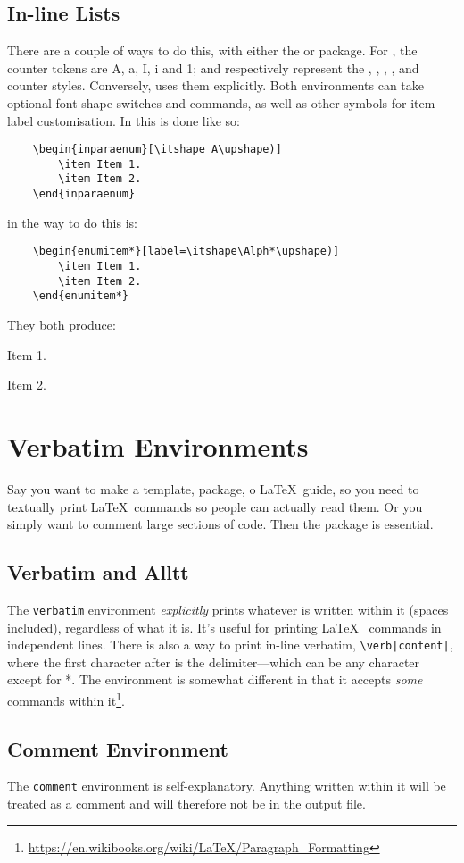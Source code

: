 \subsection{In-line Lists}
%
There are a couple of ways to do this, with either the 
or  package.  For , the counter tokens
are A, a, I, i and 1; and respectively represent the ,
, , , and  counter
styles.  Conversely,  uses them explicitly.  Both
environments can take optional font shape switches and commands, as
well as other symbols for item label customisation.  In
 this is done like so:
\begin{verbatim}
	\begin{inparaenum}[\itshape A\upshape)]
	    \item Item 1.
	    \item Item 2.
	\end{inparaenum}
\end{verbatim}
in  the way to do this is:
\begin{verbatim}
	\begin{enumitem*}[label=\itshape\Alph*\upshape)]
	    \item Item 1.
	    \item Item 2.
	\end{enumitem*}
\end{verbatim}
They both produce:
\begin{inparaenum}
\item Item 1.
\item Item 2.
\end{inparaenum}
%
\section{Verbatim Environments}
%
Say you want to make a template, package, o \LaTeX~guide, so you need
to textually print \LaTeX~commands so people can actually read them.
Or you simply want to comment large sections of code.  Then the
 package is essential.
%
\subsection{Verbatim and Alltt}
%
The \verb|verbatim| environment \emph{explicitly} prints whatever is
written within it (spaces included), regardless of what it is.  It's
useful for printing \LaTeX~ commands in independent lines.  There is
also a way to print in-line verbatim, \verb+\verb|content|+, where the
first character after
 is the delimiter---which can be any character except for *.  The 
environment is somewhat different in that it accepts \emph{some}
commands within
it\footnote{\url{https://en.wikibooks.org/wiki/LaTeX/Paragraph_Formatting}}.
%
\subsection{Comment Environment}
%
The \verb|comment| environment is self-explanatory.  Anything written
within it will be treated as a comment and will therefore not be in
the output file.
%
